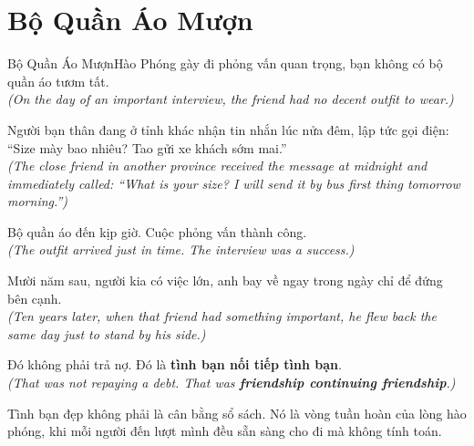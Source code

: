 \section{Bộ Quần Áo Mượn}
\begin{truyen}{Bộ Quần Áo Mượn}{Hào Phóng}
gày đi phỏng vấn quan trọng, bạn không có bộ quần áo tươm tất.\\
\textit{(On the day of an important interview, the friend had no decent outfit to wear.)}

Người bạn thân đang ở tỉnh khác nhận tin nhắn lúc nửa đêm, lập tức gọi điện: ``Size mày bao nhiêu? Tao gửi xe khách sớm mai.''\\
\textit{(The close friend in another province received the message at midnight and immediately called: ``What is your size? I will send it by bus first thing tomorrow morning.'')}

Bộ quần áo đến kịp giờ. Cuộc phỏng vấn thành công.\\
\textit{(The outfit arrived just in time. The interview was a success.)}

Mười năm sau, người kia có việc lớn, anh bay về ngay trong ngày chỉ để đứng bên cạnh.\\
\textit{(Ten years later, when that friend had something important, he flew back the same day just to stand by his side.)}

Đó không phải trả nợ. Đó là \textbf{tình bạn nối tiếp tình bạn}.\\
\textit{(That was not repaying a debt. That was \textbf{friendship continuing friendship}.)}
\end{truyen}
\begin{baihoc}
  Tình bạn đẹp không phải là cân bằng sổ sách. Nó là vòng tuần hoàn của lòng hào phóng, khi mỗi người đến lượt mình đều sẵn sàng cho đi mà không tính toán.
\end{baihoc}

